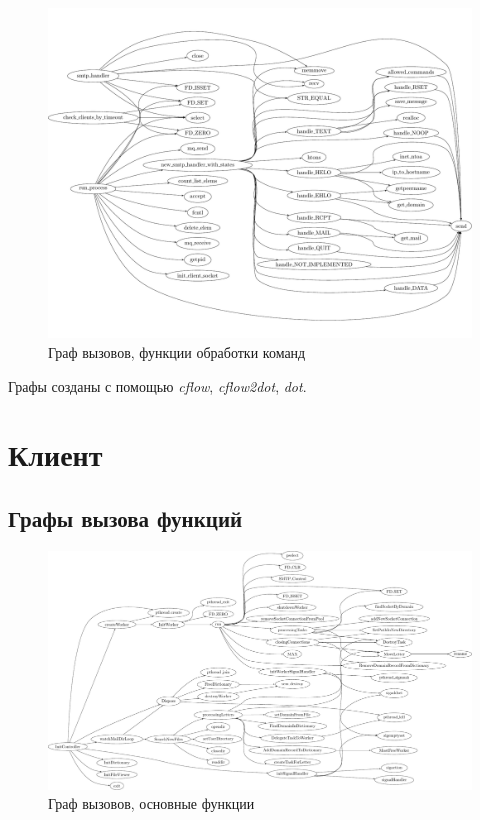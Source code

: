 \documentclass[a4paper,12pt]{report}
\begin{document}
\begin{figure}
\centering
\includegraphics[width=\textwidth]{include/scflow02_dot.pdf}
\caption{Граф вызовов, функции обработки команд}
\label{fig:scflow01}
\end{figure}

Графы созданы с помощью \textit{cflow}, \textit{cflow2dot}, \textit{dot}.


\section*{Клиент}

\subsection*{Графы вызова функций}

\begin{figure}
    \centering
    \includegraphics[width=\textwidth]{include/ccflow01_dot.pdf}
    \caption{Граф вызовов, основные функции}
    \label{fig:ccflow01}
\end{figure}
    
\end{document}

